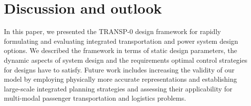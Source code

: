\section{Discussion and outlook}
\label{conclusion}

In this paper, we presented the TRANSP-0 design framework for rapidly formulating and evaluating integrated transportation and power system design options. We described the framework in terms of static design parameters, the dynamic aspects of system design and the requirements optimal control strategies for designs have to satisfy.
Future work includes increasing the validity of our model by employing physically more accurate representations and establishing large-scale integrated planning strategies and assessing their applicability for multi-modal passenger transportation and logistics problems.

